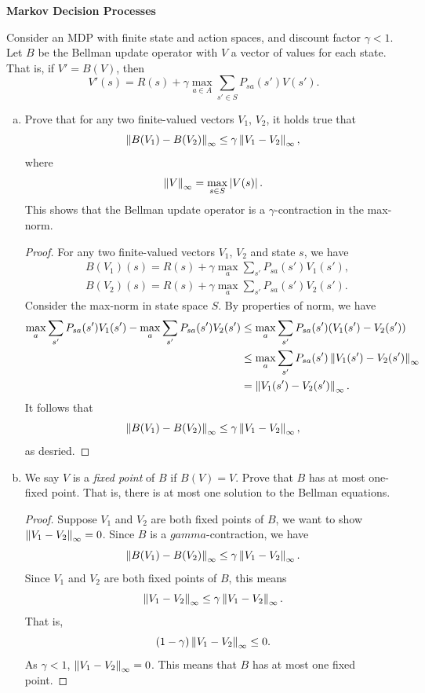 \documentclass[12pt,letterpaper,boxed]{hmcpset}
\begin{document}
\newpage
\begin{problem}[Problem 5]
  \textbf{Markov Decision Processes}

  Consider an MDP with finite state and action spaces, and discount factor $\gamma < 1$. Let $B$ be the Bellman update operator with $V$ a vector of values for each state. That is, if $V' = B(V)$, then
  \[
  V'(s) = R(s) + \gamma \max_{a \in A} \sum_{s' \in S} P_{sa}(s') V(s').
  \]
\end{problem}
\begin{solution}
  \begin{enumerate}[(a)]
    \item Prove that for any two finite-valued vectors $V_1$, $V_2$, it holds true that
    \[
    \left\lVert B(V_1) - B(V_2)\right\rVert_{\infty} \leq \gamma \left\lVert V_1 - V_2\right\rVert_{\infty},
    \]
    where 
    \[
    \left\lVert V\right\rVert_{\infty} = \max_{s \in S} \left\lvert V(s)\right\rvert.
    \]
    This shows that the Bellman update operator is a $\gamma$-contraction in the max-norm.
    
    \begin{proof}
      For any two finite-valued vectors $V_1$, $V_2$ and state $s$, we have
      \[
      \begin{aligned}
        & B(V_1) (s) = R(s) + \gamma \max_{a} \sum_{s'} P_{sa}(s') V_1(s'), \\
        & B(V_2) (s) = R(s) + \gamma \max_{a} \sum_{s'} P_{sa}(s') V_2(s').
      \end{aligned}
      \]  
      Consider the max-norm in state space $S$. By properties of norm, we have
      \[
      \begin{aligned}
        \max_{a} \sum_{s'} P_{sa}(s') V_1(s') - \max_{a} \sum_{s'} P_{sa}(s') V_2(s') &\leq \max_a \sum_{s'} P_{sa}(s') (V_1(s') - V_2(s')) \\
        & \leq \max_a \sum_{s'} P_{sa}(s') \left\lVert V_1(s') - V_2(s')\right\rVert_{\infty} \\
        &= \left\lVert V_1(s') - V_2(s')\right\rVert_{\infty}.
      \end{aligned}
      \]
      It follows that 
      \[
      \left\lVert B(V_1) - B(V_2)\right\rVert_{\infty} \leq \gamma \left\lVert V_1 - V_2\right\rVert_{\infty},
      \]
      as desried.
    \end{proof}

    \item We say $V$ is a \emph{fixed point} of $B$ if $B(V) = V$. Prove that $B$ has at most one-fixed point. That is, there is at most one solution to the Bellman equations. 
    \begin{proof}
      Suppose $V_1$ and $V_2$ are both fixed points of $B$, we want to show $\left\lVert V_1 - V_2\right\rVert_\infty = 0$. Since $B$ is a $gamma$-contraction, we have
      \[
      \left\lVert B(V_1) - B(V_2)\right\rVert_{\infty} \leq \gamma \left\lVert V_1 - V_2\right\rVert_{\infty}.
      \]
      Since $V_1$ and $V_2$ are both fixed points of $B$, this means
      \[
      \left\lVert V_1 - V_2\right\rVert_{\infty} \leq \gamma \left\lVert V_1 - V_2\right\rVert_{\infty}.
      \]
      That is,
      \[
      (1 - \gamma) \left\lVert V_1 - V_2\right\rVert_{\infty} \leq 0.
      \]
      As $\gamma < 1$, $\left\lVert V_1 - V_2\right\rVert_{\infty} = 0$. This means that $B$ has at most one fixed point.
    \end{proof}
  \end{enumerate}
\end{solution}
\end{document}
